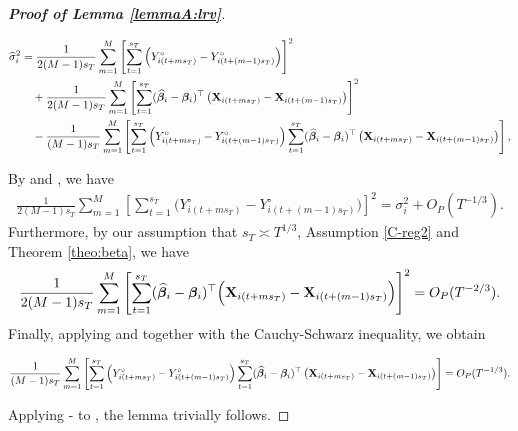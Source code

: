 \documentclass[a4paper,12pt]{article}
\makeatletter
\renewcommand{\eqref}[1]{\tagform@{\ref{#1}}}
\makeatother
\begin{document}
\begin{proof}[\textnormal{\textbf{Proof of Lemma \ref{lemmaA:lrv}}}]
\begin{footnotesize}
\begin{align}\label{eqA:lrv:proof1}
\widehat{\sigma}_i^2  &= \frac{1}{2(M-1)s_T}\sum_{m=1}^M \left[\sum_{t = 1}^{s_T} \left(Y_{i(t + ms_T)}^\circ - Y_{i(t + (m-1)s_T)}^\circ\right)\right]^2 \nonumber\\
&\quad + \frac{1}{2(M-1)s_T}\sum_{m=1}^M \left[\sum_{t = 1}^{s_T} (\widehat{\bm{\beta}}_i - \bm{\beta}_i)^\top\left(\mathbf{X}_{i(t+ms_T)} - \mathbf{X}_{i(t+(m-1)s_T)}\right) \right]^2\\
 &\quad - \frac{1}{(M-1)s_T}\sum_{m=1}^M \left[\sum_{t = 1}^{s_T}  \left(Y_{i(t + ms_T)}^\circ - Y_{i(t + (m-1)s_T)}^\circ\right)\sum_{t = 1}^{s_T} (\widehat{\bm{\beta}}_i - \bm{\beta}_i)^\top\left(\mathbf{X}_{i(t+ms_T)} - \mathbf{X}_{i(t+(m-1)s_T)}\right) \right]\nonumber,
\end{align}
\end{footnotesize}
By \cite{Carlstein1986} and \cite{WuZhao2007}, we have
\begin{align}\label{eqA:lrv:proof2}
\frac{1}{2(M-1)s_T}\sum_{m=1}^M \left[\sum_{t = 1}^{s_T} \Big(Y_{i(t + ms_T)}^\circ - Y_{i(t + (m-1)s_T)}^\circ\Big)\right]^2  = \sigma_i^2 + O_P(T^{-1/3}).
\end{align}
Furthermore, by our assumption that $s_T \asymp T^{1/3}$, Assumption \ref{C-reg2} and Theorem \ref{theo:beta}, we have
\begin{align}\label{eqA:lrv:proof3}
\frac{1}{2(M-1)s_T}\sum_{m=1}^M \left[\sum_{t = 1}^{s_T} (\widehat{\bm{\beta}}_i - \bm{\beta}_i)^\top\Big(\mathbf{X}_{i(t+ms_T)} - \mathbf{X}_{i(t+(m-1)s_T)}\Big) \right]^2 = O_P(T^{-2/3}).
\end{align}
Finally, applying \eqref{eqA:lrv:proof2} and \eqref{eqA:lrv:proof3} together with the Cauchy-Schwarz inequality, we obtain
\begin{scriptsize}
\begin{align}\label{eqA:lrv:proof4}
\frac{1}{(M-1)s_T}\sum_{m=1}^M \left[\sum_{t = 1}^{s_T}  \left(Y_{i(t + ms_T)}^\circ - Y_{i(t + (m-1)s_T)}^\circ\right)\sum_{t = 1}^{s_T} (\widehat{\bm{\beta}}_i - \bm{\beta}_i)^\top\left(\mathbf{X}_{i(t+ms_T)} - \mathbf{X}_{i(t+(m-1)s_T)}\right) \right] = O_P(T^{-1/3}).
\end{align}
\end{scriptsize}

Applying \eqref{eqA:lrv:proof2} - \eqref{eqA:lrv:proof4} to \eqref{eqA:lrv:proof1}, the lemma trivially follows.
\end{proof}
\end{document}
